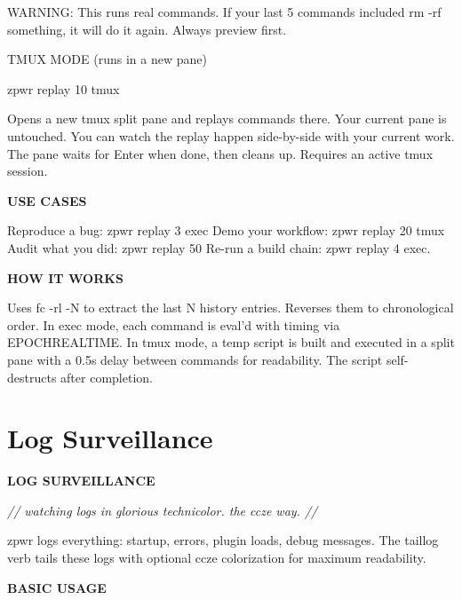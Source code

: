 \documentclass[11pt,a4paper,twoside]{book}
\begin{document}
WARNING: This runs real commands. If your last 5 commands included rm -rf something, it will do it again. Always preview first.

TMUX MODE (runs in a new pane)

\begin{codebox}
\color{neongreen}zpwr replay 10 tmux\\
\end{codebox}

Opens a new tmux split pane and replays commands there. Your current pane is untouched. You can watch the replay happen side-by-side with your current work. The pane waits for Enter when done, then cleans up. Requires an active tmux session.


\vspace{12pt}
{\bfseries\color{neonyellow} USE CASES}\vspace{4pt}

Reproduce a bug:       zpwr replay 3 exec Demo your workflow:     zpwr replay 20 tmux Audit what you did:     zpwr replay 50 Re-run a build chain:   zpwr replay 4 exec.


\vspace{12pt}
{\bfseries\color{neonyellow} HOW IT WORKS}\vspace{4pt}

Uses fc -rl -N to extract the last N history entries. Reverses them to chronological order. In exec mode, each command is eval'd with timing via EPOCHREALTIME. In tmux mode, a temp script is built and executed in a split pane with a 0.5s delay between commands for readability. The script self-destructs after completion.


\vspace{16pt}

\section{Log Surveillance}


\vspace{10pt}
{\large\bfseries\color{neoncyan} LOG SURVEILLANCE}\vspace{6pt}

{\small\itshape\color{dimtext} // watching logs in glorious technicolor. the ccze way. //}

zpwr logs everything: startup, errors, plugin loads, debug messages. The taillog verb tails these logs with optional ccze colorization for maximum readability.


\vspace{12pt}
{\bfseries\color{neonyellow} BASIC USAGE}\vspace{4pt}
\end{document}
